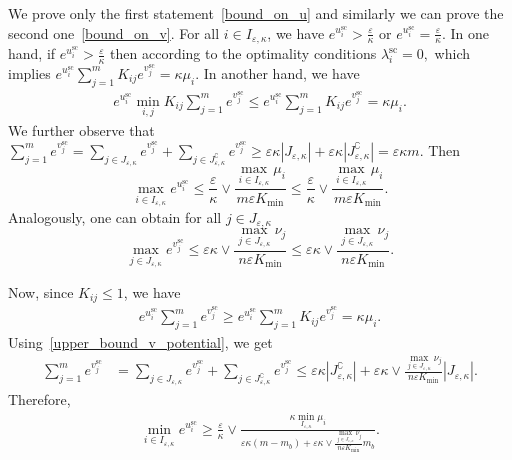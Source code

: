 We prove only the first statement~\eqref{bound_on_u} and similarly we can prove the second one~\eqref{bound_on_v}.
For all $i\in I_{\varepsilon,\kappa}$, we have $e^{u^{\text{sc}}_i} > \frac \varepsilon\kappa$ or $e^{u^{\text{sc}}_i} = \frac \varepsilon\kappa$. In one hand, if $e^{u^{\text{sc}}_i} > \frac \varepsilon\kappa$ then according to the optimality conditions $\lambda^{\text{sc}}_i = 0,$ which implies $e^{u^{\text{sc}}_i} \sum_{j=1}^m K_{ij} e^{v^{\text{sc}}_j} = \kappa\mu_i$.
In another hand, we have 
\begin{align*}
e^{u^{\text{sc}}_i} \min_{i,j}K_{ij} \sum_{j=1}^m e^{v^{\text{sc}}_j} \leq e^{u^{\text{sc}}_i} \sum_{j=1}^m K_{ij} e^{v^{\text{sc}}_j} = \kappa\mu_i.
\end{align*}
We further observe that $\sum_{j=1}^m e^{v^{\text{sc}}_j} = \sum_{j \in J_{\varepsilon,\kappa}} e^{v^{\text{sc}}_j} + \sum_{j \in J^\complement_{\varepsilon,\kappa}} e^{v^{\text{sc}}_j} \geq \varepsilon\kappa |J_{\varepsilon,\kappa}| + \varepsilon\kappa |J^\complement_{\varepsilon,\kappa}|=\varepsilon\kappa m.$ Then
\begin{equation*}
\max_{i\in I_{\varepsilon,\kappa}} e^{u^{\text{sc}}_i} \leq \frac \varepsilon\kappa \vee \frac{\max_{i\in I_{\varepsilon,\kappa}}\mu_i}{m\varepsilon K_{\min}} \leq \frac \varepsilon\kappa \vee \frac{\max_{i\in I_{\varepsilon,\kappa}}\mu_i}{m\varepsilon K_{\min}}.
\end{equation*}
Analogously, one can obtain for all $j\in J_{\varepsilon,\kappa}$
\begin{equation}
\label{upper_bound_v_potential}
\max_{j\in J_{\varepsilon,\kappa}}e^{v^{\text{sc}}_j} \leq \varepsilon\kappa \vee \frac{\max_{j \in J_{\varepsilon,\kappa}} \nu_j}{n\varepsilon K_{\min}} \leq \varepsilon\kappa \vee \frac{\max_{j \in J_{\varepsilon,\kappa}} \nu_j}{n\varepsilon K_{\min}} .
\end{equation}

Now, since $K_{ij} \leq 1$, we have 
\begin{align*}
e^{u^{\text{sc}}_i} \sum_{j=1}^m e^{v^{\text{sc}}_j} \geq e^{u^{\text{sc}}_i} \sum_{j=1}^m K_{ij}e^{v^{\text{sc}}_j} = \kappa\mu_i.
\end{align*}
Using~\eqref{upper_bound_v_potential}, we get 
\begin{align*}
\sum_{j=1}^m e^{v^{\text{sc}}_j} &= \sum_{j \in J_{\varepsilon,\kappa}} e^{v^{\text{sc}}_j} + \sum_{j \in J^\complement_{\varepsilon,\kappa}} e^{v^{\text{sc}}_j}
\leq \varepsilon\kappa |J^\complement_{\varepsilon,\kappa}| + \varepsilon\kappa \vee \frac{\max_{j\in J_{\varepsilon,\kappa}} \nu_j}{n\varepsilon K_{\min}} |J_{\varepsilon,\kappa}|.
\end{align*}
Therefore,
\begin{align*}
\min_{i \in I_{\varepsilon,\kappa}} e^{u^{\text{sc}}_i}  \geq \frac \varepsilon\kappa \vee \frac{\kappa\min_{I_{\varepsilon,\kappa}}\mu_i}{\varepsilon\kappa (m-m_b) + \varepsilon\kappa \vee \frac{\max_{j\in J_{\varepsilon,\kappa}} \nu_j}{n\varepsilon K_{\min}} m_b}.
\end{align*}

